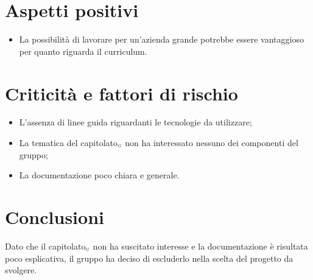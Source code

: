 \section{Aspetti positivi} \label{C5AspettiPositivi}
\begin{itemize}
	\item La possibilità di lavorare per un'azienda grande potrebbe essere vantaggioso per quanto riguarda il curriculum.
\end{itemize}
\section{Criticità e fattori di rischio} \label{C5CriticitàEFattoriDiRischio}
\begin{itemize}
	\item L'assenza di linee guida riguardanti le tecnologie da utilizzare;
	\item La tematica del capitolato$_{\scaleto{G}{3pt}}$ non ha interessato nessuno dei componenti del gruppo;
	\item La documentazione poco chiara e generale.
\end{itemize}
\section{Conclusioni} \label{C5Conclusioni}
Dato che il capitolato$_{\scaleto{G}{3pt}}$ non ha suscitato interesse e la documentazione è risultata poco esplicativa, il gruppo ha deciso di escluderlo nella scelta del progetto da svolgere.